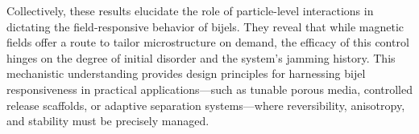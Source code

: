 Collectively, these results elucidate the role of particle-level interactions in dictating the field-responsive behavior of bijels. They reveal that while 
magnetic fields offer a route to tailor microstructure on demand, the efficacy of this control hinges on the degree of initial disorder and the system’s 
jamming history. This mechanistic understanding provides design principles for harnessing bijel responsiveness in practical applications—such as tunable 
porous media, controlled release scaffolds, or adaptive separation systems—where reversibility, anisotropy, and stability must be precisely managed.



